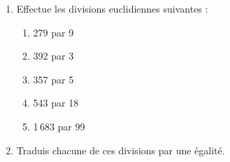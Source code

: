 
\begin{enumerate}
\item Effectue les divisions euclidiennes suivantes :
\begin{multicols}{3}
\begin{enumerate}
\item 279 par 9
\item 392 par 3
\item 357 par 5
\item 543 par 18
\item 1\,683 par 99
\end{enumerate}
\end{multicols}
\item Traduis chacune de ces divisions par une égalité.
\end{enumerate}
